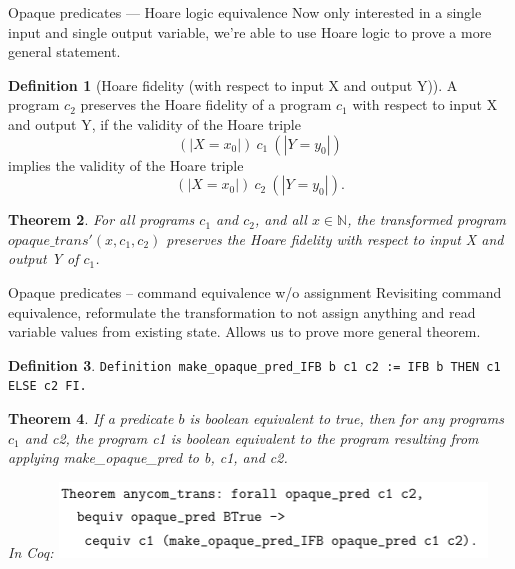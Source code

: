 \documentclass[10pt,handout]{beamer}
\theoremstyle{plain}
\newtheorem{theo}{Theorem}[section]
\theoremstyle{definition}
\newtheorem{defin}[theo]{Definition}
\newcommand\N{\mathbb{N}}
\begin{document}
\begin{frame}{Opaque predicates --- Hoare logic equivalence}
Now only interested in a single input and single output variable, we're able to use Hoare logic to prove a more general statement.

\begin{defin}[Hoare fidelity (with respect to input X and output Y)]
A program $c_2$ preserves the {\color{red}Hoare fidelity} of a program $c_1$ with respect to input X and output Y, if the validity of the Hoare triple
\[
(| X = x_0 |)\ c_1\ (| Y = y_0 |)
\]
implies the validity of the Hoare triple
\[
(| X = x_0 |)\ c_2\ (| Y = y_0 |).
\]
\end{defin}
\pause
\begin{theo}\label{hoare_xy_main}
For all programs $c_1$ and $c_2$, and all $x \in \N$, the transformed program $opaque\_trans'(x, c_1, c_2)$ preserves the Hoare fidelity with respect to input X and output Y of $c_1$.
\end{theo}

\end{frame}

\begin{frame}{Opaque predicates -- command equivalence w/o assignment}
Revisiting command equivalence, reformulate the transformation to not assign anything and read variable values from existing state.  Allows us to prove more general theorem.

\begin{defin}
\texttt{Definition make\_opaque\_pred\_IFB b c1 c2 := IFB b THEN c1 ELSE c2 FI.}
\end{defin}
\par\medskip\pause
\begin{theo}
    If a predicate $b$ is boolean equivalent to true, then for any programs $c_1$ and c2,
the program c1 is boolean equivalent to the program resulting from applying make\_opaque\_pred
to b, c1, and c2. \par\medskip
In Coq:
\includegraphics[scale=0.5]{anycom}


\end{theo}
    
\end{frame}
\end{document}
